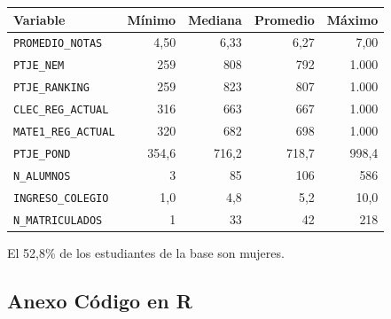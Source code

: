 \documentclass[11pt]{article}
\begin{document}
\begin{center}
\begin{tabular}{lrrrr}
\toprule
\textbf{Variable} & \textbf{Mínimo} & \textbf{Mediana} & \textbf{Promedio} & \textbf{Máximo} \\
\midrule
\texttt{PROMEDIO\_NOTAS}   & 4,50  & 6,33  & 6,27  & 7,00 \\
\texttt{PTJE\_NEM}         & 259   & 808   & 792   & 1.000 \\
\texttt{PTJE\_RANKING}     & 259   & 823   & 807   & 1.000 \\
\texttt{CLEC\_REG\_ACTUAL} & 316   & 663   & 667   & 1.000 \\
\texttt{MATE1\_REG\_ACTUAL}& 320   & 682   & 698   & 1.000 \\
\texttt{PTJE\_POND}        & 354,6 & 716,2 & 718,7 & 998,4 \\
\texttt{N\_ALUMNOS}        & 3     & 85    & 106   & 586 \\
\texttt{INGRESO\_COLEGIO}  & 1,0   & 4,8   & 5,2   & 10,0 \\
\texttt{N\_MATRICULADOS}   & 1     & 33    & 42    & 218 \\
\bottomrule
\end{tabular}
\end{center}

El 52,8\% de los estudiantes de la base son mujeres.

\newpage
\subsection*{Anexo \; Código en R}
\end{document}
